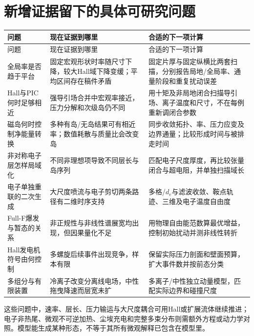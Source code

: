 \section{新增证据留下的具体可研究问题}
\begin{longtable}{P{36mm}P{67mm}P{46mm}}
\toprule 问题 & 现在证据到哪里 & 合适的下一项计算\\\midrule\endfirsthead
\toprule 问题 & 现在证据到哪里 & 合适的下一项计算\\\midrule\endhead
全局率是否趋于平台 & 固定宏观形状时率随尺寸下降，较大Hall域下降变缓；平均区间存在稿件矛盾\citep{F600} & 固定片厚与固定纵横比两套扫描，分别报告局地/全局率、通量阶段和重复扰动误差\\
Hall与PIC何时足够相近 & 强导引场合并中宏观率接近，压力分解和次级岛仍不同\citep{L241} & 用十矩及非局地闭合扫描导引场、离子温度和尺寸，不在每例重新调闭合参数\\
磁岛何时控制净能量转换 & 多种有岛/无岛结果可有相近率；数值耗散与质量比会改变岛\citep{F606,F788} & 同步收敛拓扑、率、压力应变及边界通量；比较形成时间与被排走时间\\
非对称电子层怎样局域化 & 不同非理想项导致不同层长与岛序列\citep{F625} & 匹配电子尺度厚度，再比较张量闭合与超电阻，并单独扫描域长\\
电子单独重联的二次生成 & 大尺度喷流与电子剪切两条路径有二维时序支持\citep{F655} & 多格/$d_e$与滤波收敛、鞍点轨迹、三维及电子温度自由度\\
Full-F爆发与暂态的关系 & 非正规性与非线性谱展宽均出现，但因果量化不足\citep{L314} & 用物理自由能范数算最优增益，控制初始扰动并测非线性转折\\
Hall发电机符号由何控制 & 多螺旋后续事件出现竞争，样本有限\citep{F798} & 保留实际压力剖面和壁面预算，扩大事件数并按前态分类\\
多组分与有限装置 & 冷离子改变分离线电场，中性拖曳降速而层宽未扩\citep{L227,L190} & 多离子/中性独立动量模型，匹配实际边界和碰撞尺度\\
\bottomrule
\end{longtable}

这些问题中，速率、层长、压力输运与大尺度耦合可用Hall或扩展流体继续推进；电子非热尾、微观不可逆加热、尘埃充电和完整多束分布则需额外方程或动力学对照。模型能生成某种形态，不等于其所有微观解释已包含在模型里。


